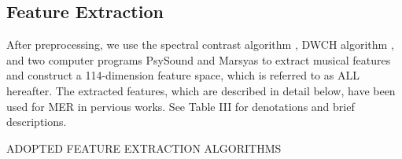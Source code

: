 \documentclass[journal, twoside]{IEEEtran}
\begin{document}
\subsection{Feature Extraction}
After preprocessing, we use the spectral contrast algorithm \cite{3}, DWCH algorithm \cite{2}, and two computer programs PsySound \cite{27} and Marsyas \cite{29} to extract musical features and construct a 114-dimension feature space, which is referred to as ALL hereafter. The extracted features, which are described in detail below, have been used for MER in pervious works. See Table III for denotations and brief descriptions.

\bgroup
\def\arraystretch{1.3}
\vspace{1cm}
\begin{table}[ht]
    \centering
        \caption{ADOPTED FEATURE EXTRACTION ALGORITHMS}
        \label{table3}
    

\end{table}
\end{document}
